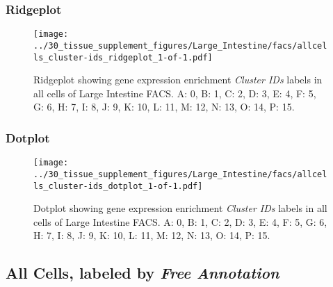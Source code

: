 \clearpage

\subsubsection{Ridgeplot}
\begin{figure}[h]
\centering
\texttt{[image: ../30\_tissue\_supplement\_figures/Large\_Intestine/facs/allcells\_cluster-ids\_ridgeplot\_1-of-1.pdf]}

\caption{ Ridgeplot  showing gene expression enrichment \emph{Cluster IDs} labels in all cells of Large Intestine FACS. A: 0, B: 1, C: 2, D: 3, E: 4, F: 5, G: 6, H: 7, I: 8, J: 9, K: 10, L: 11, M: 12, N: 13, O: 14, P: 15.}
\end{figure}


\clearpage

\subsubsection{Dotplot}
\begin{figure}[h]
\centering
\texttt{[image: ../30\_tissue\_supplement\_figures/Large\_Intestine/facs/allcells\_cluster-ids\_dotplot\_1-of-1.pdf]}

\caption{ Dotplot  showing gene expression enrichment \emph{Cluster IDs} labels in all cells of Large Intestine FACS. A: 0, B: 1, C: 2, D: 3, E: 4, F: 5, G: 6, H: 7, I: 8, J: 9, K: 10, L: 11, M: 12, N: 13, O: 14, P: 15.}
\end{figure}


\clearpage

\subsection{All Cells, labeled by \emph{Free Annotation}}
